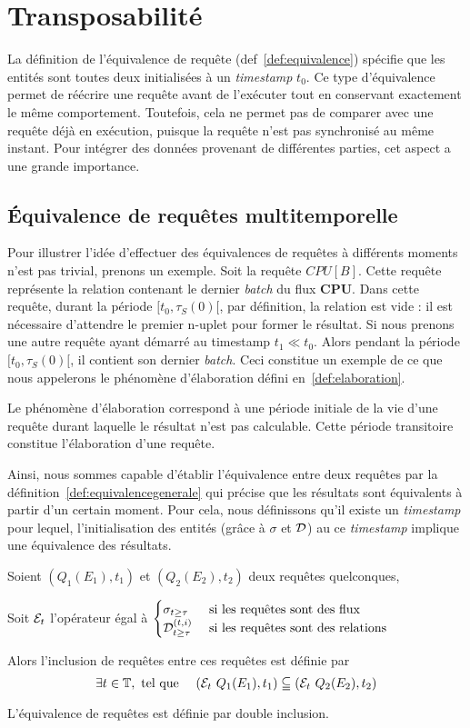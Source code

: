 \section{Transposabilité}\label{sec:contrib:astral:transposabilite}
La définition de l'équivalence de requête (def~\ref{def:equivalence}) spécifie que les entités sont toutes deux initialisées à un \textit{timestamp} $t_0$. Ce type d'équivalence permet de réécrire une requête avant de l'exécuter tout en conservant exactement le même comportement. Toutefois, cela ne permet pas de comparer avec une requête déjà en exécution, puisque la requête n'est pas synchronisé au même instant. Pour intégrer des données provenant de différentes parties, cet aspect a une grande importance.
\subsection{Équivalence de requêtes multitemporelle}
Pour illustrer l'idée d'effectuer des équivalences de requêtes à différents moments n'est pas trivial, prenons un exemple. Soit la requête $CPU[B]$. Cette requête représente la relation contenant le dernier \textit{batch} du flux \textbf{CPU}. Dans cette requête, durant la période $[t_0,\tau_S(0)[$, par définition, la relation est vide : il est nécessaire d'attendre le premier n-uplet pour former le résultat. Si nous prenons une autre requête ayant démarré au timestamp $t_1 \ll t_0$. Alors pendant la période $[t_0,\tau_S(0)[$, il contient son dernier \textit{batch}. Ceci constitue un exemple de ce que nous appelerons le phénomène d'élaboration défini en~\ref{def:elaboration}.
\begin{defi}\label{def:elaboration}
    Le phénomène d'élaboration correspond à une période initiale de la vie d'une requête durant laquelle le résultat n'est pas calculable. Cette période transitoire constitue l'élaboration d'une requête.
\end{defi}

Ainsi, nous sommes capable d'établir l'équivalence entre deux requêtes par la définition~\ref{def:equivalencegenerale} qui précise que les résultats sont équivalents à partir d'un certain moment. Pour cela, nous définissons qu'il existe un \textit{timestamp} pour lequel, l'initialisation des entités (grâce à $\sigma$ et $\mathcal{D}$) au ce \textit{timestamp} implique une équivalence des résultats.
\begin{defi}\label{def:equivalencegenerale}
    Soient $(Q_1(E_1),t_1)$ et $(Q_2(E_2),t_2)$ deux requêtes quelconques,

    Soit $\mathcal{E}_t$ l'opérateur égal à $\begin{cases} \sigma_{t\geq \tau} & \textrm{ si les requêtes sont des flux}\\ \mathcal{D}_{t\geq \tau}^{(t,i)} & \textrm{  si les requêtes sont des relations}\end{cases}$

    Alors l'inclusion de requêtes entre ces requêtes est définie par $$\exists t \in \mathbb{T}, \textrm{ tel que } \quad (\mathcal{E}_t\ Q_1(E_1), t_1) \subseteqq (\mathcal{E}_t\  Q_2(E_2), t_2)$$

    L'équivalence de requêtes est définie par double inclusion.
\end{defi}

